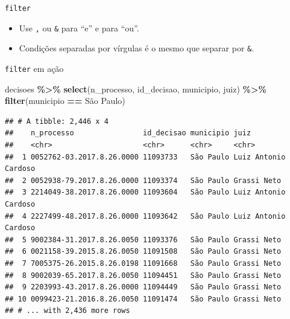 \documentclass[
  10pt,
  ignorenonframetext,
]{beamer}
\newenvironment{Shaded}{\begin{snugshade}}{\end{snugshade}}
\newcommand{\KeywordTok}[1]{\textcolor[rgb]{0.13,0.29,0.53}{\textbf{#1}}}
\newcommand{\NormalTok}[1]{#1}
\newcommand{\OperatorTok}[1]{\textcolor[rgb]{0.81,0.36,0.00}{\textbf{#1}}}
\newcommand{\StringTok}[1]{\textcolor[rgb]{0.31,0.60,0.02}{#1}}
\providecommand{\tightlist}{%
  \setlength{\itemsep}{0pt}\setlength{\parskip}{0pt}}
\begin{document}
\begin{frame}[fragile]{\texttt{filter}}
\protect\hypertarget{filter-1}{}
\begin{itemize}
\tightlist
\item
  Use \texttt{,} ou \texttt{\&} para ``e'' e \texttt{\textbar{}} para
  ``ou''.
\item
  Condições separadas por vírgulas é o mesmo que separar por
  \texttt{\&}.
\end{itemize}
\end{frame}

\begin{frame}[fragile]{\texttt{filter} em ação}
\protect\hypertarget{filter-em-auxe7uxe3o}{}
\begin{Shaded}
\begin{Highlighting}[]
\NormalTok{decisoes }\OperatorTok{\%\textgreater{}\%}\StringTok{ }
\StringTok{  }\KeywordTok{select}\NormalTok{(n\_processo, id\_decisao, municipio, juiz) }\OperatorTok{\%\textgreater{}\%}\StringTok{ }
\StringTok{  }\KeywordTok{filter}\NormalTok{(municipio }\OperatorTok{==}\StringTok{ \textquotesingle{}São Paulo\textquotesingle{}}\NormalTok{)}
\end{Highlighting}
\end{Shaded}

\begin{verbatim}
## # A tibble: 2,446 x 4
##    n_processo                id_decisao municipio juiz                
##    <chr>                     <chr>      <chr>     <chr>               
##  1 0052762-03.2017.8.26.0000 11093733   São Paulo Luiz Antonio Cardoso
##  2 0052938-79.2017.8.26.0000 11093374   São Paulo Grassi Neto         
##  3 2214049-38.2017.8.26.0000 11093604   São Paulo Luiz Antonio Cardoso
##  4 2227499-48.2017.8.26.0000 11093642   São Paulo Luiz Antonio Cardoso
##  5 9002384-31.2017.8.26.0050 11093376   São Paulo Grassi Neto         
##  6 0021158-39.2015.8.26.0050 11091508   São Paulo Grassi Neto         
##  7 7005375-26.2015.8.26.0198 11091668   São Paulo Grassi Neto         
##  8 9002039-65.2017.8.26.0050 11094451   São Paulo Grassi Neto         
##  9 2203993-43.2017.8.26.0000 11094449   São Paulo Grassi Neto         
## 10 0099423-21.2016.8.26.0050 11091474   São Paulo Grassi Neto         
## # ... with 2,436 more rows
\end{verbatim}
\end{frame}
\end{document}
